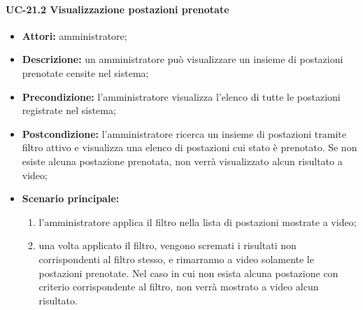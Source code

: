 \paragraph{UC-21.2 Visualizzazione postazioni prenotate}
\begin{itemize}
    \item \textbf{Attori:} amministratore;
    \item \textbf{Descrizione:} un amministratore pu\`{o} visualizzare un insieme di postazioni prenotate censite nel sistema;
    \item \textbf{Precondizione:} l'amministratore visualizza l'elenco di tutte le postazioni registrate nel sistema;
    \item \textbf{Postcondizione:} l'amministratore ricerca un insieme di postazioni tramite filtro attivo e visualizza una elenco di postazioni cui stato è prenotato. Se non esiste alcuna postazione prenotata, non verrà visualizzato alcun risultato a video;
    \item \textbf{Scenario principale:}
    \begin{enumerate}
        \item l'amministratore applica il filtro nella lista di postazioni mostrate a video;
        \item una volta applicato il filtro, vengono scremati i risultati non corrispondenti al filtro stesso, e rimarranno a video solamente le postazioni prenotate. Nel caso in cui non esista alcuna postazione con criterio corrispondente al filtro, non verrà mostrato a video alcun risultato.
    \end{enumerate}
\end{itemize}

